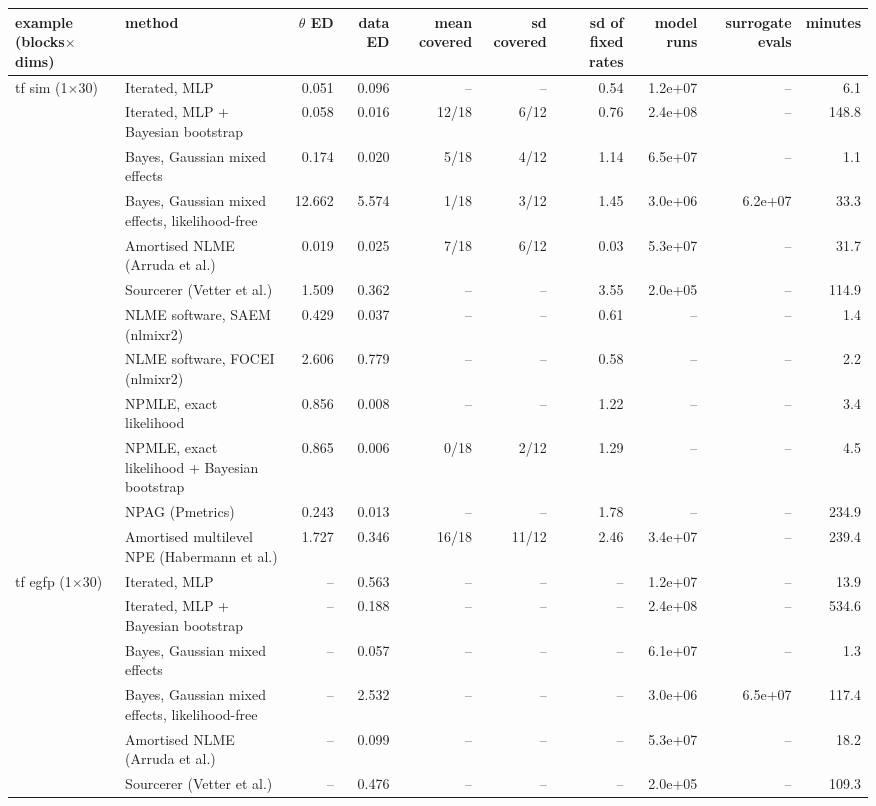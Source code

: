 \begin{tabular}{llrrrrrrrr}
\toprule
example (blocks$\times$dims) & method & $\theta$ ED & data ED & mean covered & sd covered & sd of fixed rates & model runs & surrogate evals & minutes \\
\midrule
tf sim (1$\times$30) & Iterated, MLP & 0.051 & 0.096 & -- & -- & 0.54 & 1.2e+07 & -- & 6.1 \\
 & Iterated, MLP + Bayesian bootstrap & 0.058 & 0.016 & 12/18 & 6/12 & 0.76 & 2.4e+08 & -- & 148.8 \\
 & Bayes, Gaussian mixed effects & 0.174 & 0.020 & 5/18 & 4/12 & 1.14 & 6.5e+07 & -- & 1.1 \\
 & Bayes, Gaussian mixed effects, likelihood-free & 12.662 & 5.574 & 1/18 & 3/12 & 1.45 & 3.0e+06 & 6.2e+07 & 33.3 \\
 & Amortised NLME (Arruda et al.) & 0.019 & 0.025 & 7/18 & 6/12 & 0.03 & 5.3e+07 & -- & 31.7 \\
 & Sourcerer (Vetter et al.) & 1.509 & 0.362 & -- & -- & 3.55 & 2.0e+05 & -- & 114.9 \\
 & NLME software, SAEM (nlmixr2) & 0.429 & 0.037 & -- & -- & 0.61 & -- & -- & 1.4 \\
 & NLME software, FOCEI (nlmixr2) & 2.606 & 0.779 & -- & -- & 0.58 & -- & -- & 2.2 \\
 & NPMLE, exact likelihood & 0.856 & 0.008 & -- & -- & 1.22 & -- & -- & 3.4 \\
 & NPMLE, exact likelihood + Bayesian bootstrap & 0.865 & 0.006 & 0/18 & 2/12 & 1.29 & -- & -- & 4.5 \\
 & NPAG (Pmetrics) & 0.243 & 0.013 & -- & -- & 1.78 & -- & -- & 234.9 \\
 & Amortised multilevel NPE (Habermann et al.) & 1.727 & 0.346 & 16/18 & 11/12 & 2.46 & 3.4e+07 & -- & 239.4 \\ \addlinespace
tf egfp (1$\times$30) & Iterated, MLP & -- & 0.563 & -- & -- & -- & 1.2e+07 & -- & 13.9 \\
 & Iterated, MLP + Bayesian bootstrap & -- & 0.188 & -- & -- & -- & 2.4e+08 & -- & 534.6 \\
 & Bayes, Gaussian mixed effects & -- & 0.057 & -- & -- & -- & 6.1e+07 & -- & 1.3 \\
 & Bayes, Gaussian mixed effects, likelihood-free & -- & 2.532 & -- & -- & -- & 3.0e+06 & 6.5e+07 & 117.4 \\
 & Amortised NLME (Arruda et al.) & -- & 0.099 & -- & -- & -- & 5.3e+07 & -- & 18.2 \\
 & Sourcerer (Vetter et al.) & -- & 0.476 & -- & -- & -- & 2.0e+05 & -- & 109.3 \\

\end{tabular}
